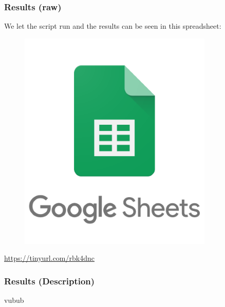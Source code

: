 \begin{frame} \frametitle{Results (raw)}

	We let the script run and the results can be seen in this spreadsheet:
	
	\begin{center}
		\begin{figure}[H]
			\includegraphics[width=.3\textwidth]{img/sheets}
		\end{figure}
		{\color{red} \url{https://tinyurl.com/rbk4dnc}}
	\end{center}
	\vfill
	
	

\end{frame}

\begin{frame} \frametitle{Results (Description)}
	vubub
\end{frame}
